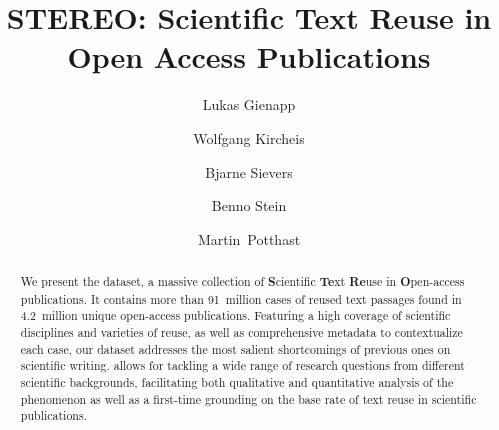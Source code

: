 \title{STEREO: Scientific Text Reuse in Open Access Publications}

\author[1,*]{Lukas Gienapp}
\author[1]{Wolfgang Kircheis}
\author[1]{Bjarne Sievers}
\author[2]{Benno Stein}
\author[1,*]{Martin~Potthast}


\begin{abstract}
We present the \webisReuseCorpus dataset, a massive collection of \textbf{S}cientific \textbf{Te}xt \textbf{Re}use in \textbf{O}pen-access publications. It contains more than 91~million cases of reused text passages found in 4.2~million unique open-access publications. Featuring a high coverage of scientific disciplines and varieties of reuse, as well as comprehensive metadata to contextualize each case, our dataset addresses the most salient shortcomings of previous ones on scientific writing. \webisReuseCorpus allows for tackling a wide range of research questions from different scientific backgrounds, facilitating both qualitative and quantitative analysis of the phenomenon as well as a first-time grounding on the base rate of text reuse in scientific publications.
\end{abstract}


\maketitle
